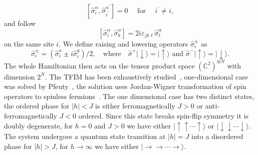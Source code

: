 \begin{equation}
	\left[\hat{\sigma}_{i}^{\alpha}, \hat{\sigma}_{i^{\prime}}^{\alpha^{\prime}}\right]=0 \quad \text { for } \quad i^{\prime} \neq i, 
\end{equation}
and follow 
\begin{equation}
	\left[\hat \sigma^\alpha_{i}, \hat \sigma^\alpha_{k}\right]=2 i \varepsilon_{j k \ell} \hat \sigma^\alpha_{\ell}
\end{equation}
on the same site $i$. We define raising and lowering operators $\hat{\sigma}_{i}^{\pm}$ as
\begin{equation}
\hat{\sigma}_{i}^{\pm} = \left(\hat{\sigma}_{i}^{x} \pm i \hat{\sigma}_{i}^{y}\right) / 2, \quad \text{where} \quad \hat{\sigma}^{+}|\downarrow\rangle=|\uparrow\rangle \text { and } \hat{\sigma}^{-}|\uparrow\rangle=|\downarrow\rangle.
\end{equation}
The whole Hamiltonian then acts on the tensor product space $\left(\mathbb{C}^{2}\right)^{\otimes N}$ with dimension $2^N$. The TFIM has been exhaustively studied~\cite{stinchcombe1973isingI, stinchcombe1973isingII}, one-dimensional case was solved by Pfeuty~\cite{pfeuty1970one}, the solution uses Jordan-Wigner transformation of spin operators to spinless fermions~\cite{lieb1961two, niemeijer1967some}. The one dimensional case has two distinct states, the ordered phase for $|h| < J$ is either ferromagnetically $J > 0$ or anti-ferromagnetically $J < 0$ ordered. Since this state breaks spin-flip symmetry it is doubly degenerate, for $h=0$ and $J>0$ we have either $|\uparrow \uparrow \cdots \uparrow \rangle$ or $|\downarrow \downarrow \cdots \downarrow \rangle$. The system undergoes a quantum state transition at $|h| = J$ into a disordered phase for $|h| > J$, for $h \rightarrow \infty$ we have either $|\rightarrow \rightarrow \cdots \rightarrow \rangle$. 


